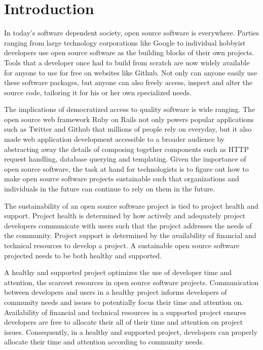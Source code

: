 \section{Introduction}

In today's software dependent society, open source software is everywhere.
Parties ranging from large technology corporations like Google to individual
hobbyist developers use open source software as the building blocks of their own
projects. Tools that a developer once had to build from scratch are now widely
available for anyone to use for free on websites like Github. Not only can
anyone easily use these software packages, but anyone can also freely access,
inspect and alter the source code, tailoring it for his or her own specialized needs.

The implications of democratized access to quality software is wide ranging. The
open source web framework Ruby on Rails not only powers popular applications
such as Twitter and Github that millions of people rely on everyday, but it also
made web application development accessible to a broader audience by abstracting
away the details of composing together components such as HTTP request handling,
database querying and templating. Given the importance of open source software,
the task at hand for technologists is to figure out how to make open source
software projects sustainable such that organizations and individuals in the
future can continue to rely on them in the future.

The sustainability of an open source software project is tied to project health
and support. Project health is determined by how actively and adequately project
developers communicate with users such that the project
addresses the needs of the community. Project support is determined by the
availability of financial and technical resources to develop a project\cite{successOSS}. A sustainable
open source software projected needs to be both healthy and supported.

A healthy and supported project optimizes the use of developer time and
attention, the scarcest resources in open source software projects.
Communication between developers and users in a healthy project informs
developers of community needs and issues to potentially focus their time and
attention on. Availability of financial and technical resources in a supported
project ensures developers are free to allocate their all of their time and attention on
project issues. Consequently, in a healthy and supported project, developers can
properly allocate their time and attention according to community needs.

